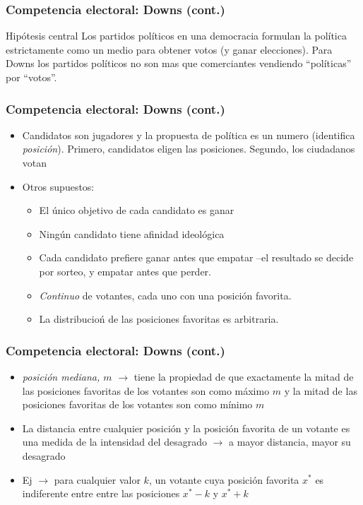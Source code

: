 \documentclass[14pt,aspectratio=169]{beamer}
\begin{document}
 \begin{frame}\frametitle{Competencia electoral: Downs (cont.)}
   \begin{block}{Hipótesis central}
Los partidos políticos en una democracia formulan la política
estrictamente como un medio para obtener votos (y ganar
elecciones). Para Downs los partidos políticos no son mas que comerciantes
vendiendo ``políticas'' por ``votos''.  
          \end{block}
\end{frame}



\begin{frame}
\frametitle{Competencia electoral: Downs (cont.)}
\begin{itemize}
\item Candidatos son jugadores y la propuesta de política
  es un numero (identifica \textit{posición}). Primero, candidatos eligen las posiciones. Segundo, los ciudadanos votan
\item Otros supuestos: \medskip
\begin{itemize} \itemsep 10pt
\item El único objetivo de cada candidato es ganar
\item Ningún candidato tiene afinidad ideológica
\item Cada candidato prefiere ganar antes que empatar --el resultado se decide por sorteo, y empatar antes que perder.
\item \textit{Continuo} de votantes, cada uno con una posición favorita.
\item La distribucioń de las posiciones favoritas es arbitraria.
\end{itemize}
\end{itemize}
\end{frame}


\begin{frame}
\frametitle{Competencia electoral: Downs (cont.)}
\begin{itemize} 
\item \textit{posición mediana, $m$} $\longrightarrow$ tiene la propiedad de que exactamente la mitad de las posiciones favoritas de los votantes son como máximo $m$ y la mitad de las posiciones favoritas de los votantes son como mínimo $m$ 
\item La distancia entre cualquier posición y la posición favorita de un votante es una medida de la intensidad del desagrado $\longrightarrow$ a mayor distancia, mayor su desagrado
\item Ej $\longrightarrow$ para cualquier valor $k$, un votante cuya posición favorita $x^{*}$ es indiferente entre entre las posiciones $x^{*}-k$ y $x^{*}+k$
\end{itemize}
\end{frame}
\end{document}
